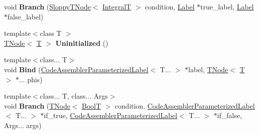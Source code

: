\begin{DoxyCompactItemize}
\item 
\mbox{\label{classv8_1_1internal_1_1compiler_1_1CodeAssembler_aa12c789d6a7eb0002e223bcd82f4244b}} 
void {\bfseries Branch} (\mbox{\hyperlink{classv8_1_1internal_1_1compiler_1_1SloppyTNode}{Sloppy\+T\+Node}}$<$ \mbox{\hyperlink{structv8_1_1internal_1_1IntegralT}{IntegralT}} $>$ condition, \mbox{\hyperlink{classv8_1_1internal_1_1compiler_1_1CodeAssemblerLabel}{Label}} $\ast$true\+\_\+label, \mbox{\hyperlink{classv8_1_1internal_1_1compiler_1_1CodeAssemblerLabel}{Label}} $\ast$false\+\_\+label)
\item 
\mbox{\label{classv8_1_1internal_1_1compiler_1_1CodeAssembler_a039072a65193816f8682575ad39e43bd}} 
{\footnotesize template$<$class T $>$ }\\\mbox{\hyperlink{classv8_1_1internal_1_1compiler_1_1TNode}{T\+Node}}$<$ \mbox{\hyperlink{classv8_1_1internal_1_1torque_1_1T}{T}} $>$ {\bfseries Uninitialized} ()
\item 
\mbox{\label{classv8_1_1internal_1_1compiler_1_1CodeAssembler_a88cd6587c477951b49b9113a45ba6328}} 
{\footnotesize template$<$class... T$>$ }\\void {\bfseries Bind} (\mbox{\hyperlink{classv8_1_1internal_1_1compiler_1_1CodeAssemblerParameterizedLabel}{Code\+Assembler\+Parameterized\+Label}}$<$ T... $>$ $\ast$label, \mbox{\hyperlink{classv8_1_1internal_1_1compiler_1_1TNode}{T\+Node}}$<$ \mbox{\hyperlink{classv8_1_1internal_1_1torque_1_1T}{T}} $>$ $\ast$... phis)
\item 
\mbox{\label{classv8_1_1internal_1_1compiler_1_1CodeAssembler_adf3c1f1f8f9aa297f9022adef8ced9c2}} 
{\footnotesize template$<$class... T, class... Args$>$ }\\void {\bfseries Branch} (\mbox{\hyperlink{classv8_1_1internal_1_1compiler_1_1TNode}{T\+Node}}$<$ \mbox{\hyperlink{structv8_1_1internal_1_1BoolT}{BoolT}} $>$ condition, \mbox{\hyperlink{classv8_1_1internal_1_1compiler_1_1CodeAssemblerParameterizedLabel}{Code\+Assembler\+Parameterized\+Label}}$<$ T... $>$ $\ast$if\+\_\+true, \mbox{\hyperlink{classv8_1_1internal_1_1compiler_1_1CodeAssemblerParameterizedLabel}{Code\+Assembler\+Parameterized\+Label}}$<$ T... $>$ $\ast$if\+\_\+false, Args... args)

\end{DoxyCompactItemize}
